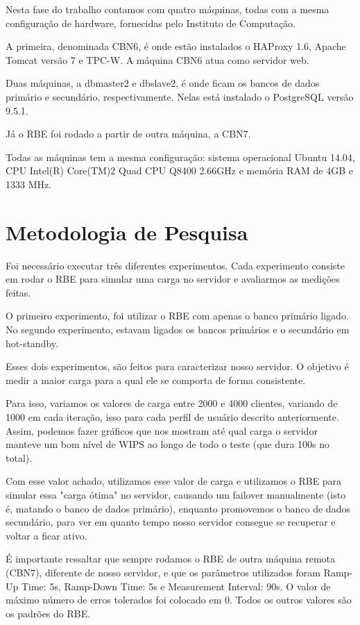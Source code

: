 \documentclass[11pt,twoside]{article}
\begin{document}
     Nesta fase do trabalho contamos com quatro máquinas, todas com a mesma configuração de hardware, fornecidas pelo Instituto de Computação.

     A primeira, denominada CBN6, é onde estão instalados o HAProxy 1.6, Apache Tomcat versão 7 e TPC-W. A máquina CBN6 atua como servidor web.

     Duas máquinas, a dbmaster2 e dbslave2, é onde ficam os bancos de dados primário e secundário, respectivamente. Nelas está instalado o PostgreSQL vers\~ao 9.5.1.

     Já o RBE foi rodado a partir de outra máquina, a CBN7.

     Todas as máquinas tem a mesma configuração: sistema operacional Ubuntu 14.04, CPU Intel(R) Core(TM)2 Quad CPU Q8400 2.66GHz e mem\'oria RAM de 4GB e 1333 MHz.

\section{Metodologia de Pesquisa}
\setlength{\parindent}{4ex}
Foi necessário executar três diferentes experimentos. Cada experimento consiste em rodar o RBE para simular uma carga no servidor e avaliarmos as medições feitas.

O primeiro experimento, foi utilizar o RBE com apenas o banco primário ligado. No segundo experimento, estavam ligados os bancos primários e o secundário em hot-standby.

Esses dois experimentos, são feitos para caracterizar nosso servidor. O objetivo é medir a maior carga para a qual ele se comporta de forma consistente.

Para isso, variamos os valores de carga entre 2000 e 4000 clientes, variando de 1000 em cada iteração, isso para cada perfil de usuário descrito anteriormente. Assim, podemos fazer gráficos que nos mostram até qual carga o servidor manteve um bom nível de WIPS ao longo de todo o teste (que dura 100s no total).

Com esse valor achado, utilizamos esse valor de carga e utilizamos o RBE para simular essa "carga ótima" no servidor, causando um failover  manualmente (isto é, matando o banco de dados primário), enquanto promovemos o banco de dados secundário, para ver em quanto tempo nosso servidor consegue se recuperar e voltar a ficar ativo.

É importante ressaltar que sempre rodamos o RBE de outra máquina remota (CBN7), diferente de nosso servidor, e que os parâmetros utilizados foram Ramp-Up Time: 5s, Ramp-Down Time: 5s e Measurement Interval: 90s. O valor de máximo número de erros tolerados foi colocado em 0. Todos os outros valores são os padrões do RBE.
\end{document}
